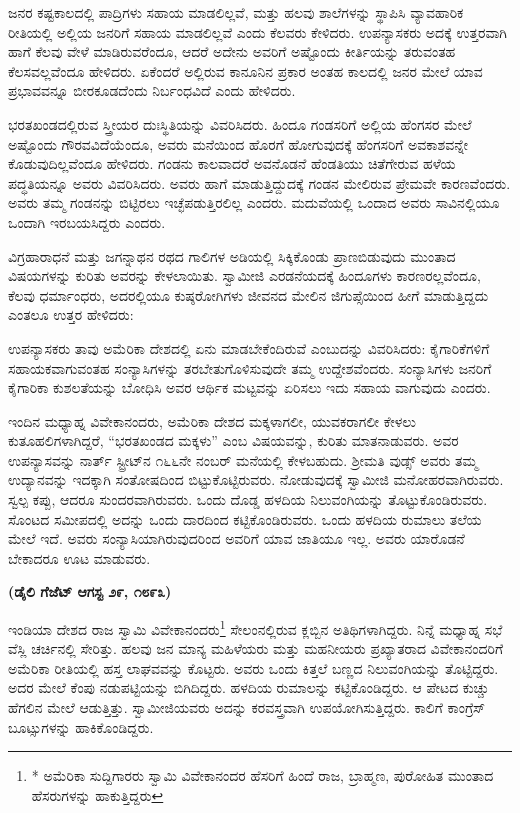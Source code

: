 ಜನರ ಕಷ್ಟಕಾಲದಲ್ಲಿ ಪಾದ್ರಿಗಳು ಸಹಾಯ ಮಾಡಲಿಲ್ಲವೆ, ಮತ್ತು ಹಲವು ಶಾಲೆಗಳನ್ನು ಸ್ಥಾಪಿಸಿ ವ್ಯಾವಹಾರಿಕ ರೀತಿಯಲ್ಲಿ ಅಲ್ಲಿಯ ಜನರಿಗೆ ಸಹಾಯ ಮಾಡಲಿಲ್ಲವೆ ಎಂದು ಕೆಲವರು ಕೇಳಿದರು. ಉಪನ್ಯಾಸಕರು ಅದಕ್ಕೆ ಉತ್ತರವಾಗಿ ಹಾಗೆ ಕೆಲವು ವೇಳೆ ಮಾಡಿರುವ\break ರೆಂದೂ, ಆದರೆ ಅದೇನು ಅವರಿಗೆ ಅಷ್ಟೊಂದು ಕೀರ್ತಿಯನ್ನು ತರುವಂತಹ ಕೆಲಸವಲ್ಲ\break ವೆಂದೂ ಹೇಳಿದರು. ಏಕೆಂದರೆ ಅಲ್ಲಿರುವ ಕಾನೂನಿನ ಪ್ರಕಾರ ಅಂತಹ ಕಾಲದಲ್ಲಿ ಜನರ ಮೇಲೆ ಯಾವ ಪ್ರಭಾವವನ್ನೂ ಬೀರಕೂಡದೆಂದು ನಿರ್ಬಂಧವಿದೆ ಎಂದು ಹೇಳಿದರು.

ಭರತಖಂಡದಲ್ಲಿರುವ ಸ್ತ್ರೀಯರ ದುಃಸ್ಥಿತಿಯನ್ನು ವಿವರಿಸಿದರು. ಹಿಂದೂ ಗಂಡಸರಿಗೆ ಅಲ್ಲಿಯ ಹೆಂಗಸರ ಮೇಲೆ ಅಷ್ಟೊಂದು ಗೌರವವಿದೆಯೆಂದೂ, ಅವರು ಮನೆಯಿಂದ ಹೊರಗೆ ಹೋಗುವುದಕ್ಕೆ ಹೆಂಗಸರಿಗೆ ಅವಕಾಶವನ್ನೇ ಕೊಡುವುದಿಲ್ಲವೆಂದೂ ಹೇಳಿದರು. ಗಂಡನು ಕಾಲವಾದರೆ ಅವನೊಡನೆ ಹೆಂಡತಿಯು ಚಿತೆಗೇರುವ ಹಳೆಯ ಪದ್ಧತಿಯನ್ನೂ ಅವರು ವಿವರಿಸಿದರು. ಅವರು ಹಾಗೆ ಮಾಡುತ್ತಿದ್ದುದಕ್ಕೆ ಗಂಡನ ಮೇಲಿರುವ ಪ್ರೇಮವೇ ಕಾರಣವೆಂದರು. ಅವರು ತಮ್ಮ ಗಂಡನನ್ನು ಬಿಟ್ಟಿರಲು ಇಚ್ಛೆಪಡುತ್ತಿರಲಿಲ್ಲ ಎಂದರು. ಮದುವೆಯಲ್ಲಿ ಒಂದಾದ ಅವರು ಸಾವಿನಲ್ಲಿಯೂ ಒಂದಾಗಿ ಇರಬಯಸಿದ್ದರು ಎಂದರು.

ವಿಗ್ರಹಾರಾಧನೆ ಮತ್ತು ಜಗನ್ನಾಥನ ರಥದ ಗಾಲಿಗಳ ಅಡಿಯಲ್ಲಿ ಸಿಕ್ಕಿಕೊಂಡು ಪ್ರಾಣಬಿಡುವುದು ಮುಂತಾದ ವಿಷಯಗಳನ್ನು ಕುರಿತು ಅವರನ್ನು ಕೇಳಲಾಯಿತು. ಸ್ವಾಮೀಜಿ ಎರಡನೆಯದಕ್ಕೆ ಹಿಂದೂಗಳು ಕಾರಣರಲ್ಲವೆಂದೂ, ಕೆಲವು ಧರ್ಮಾಂಧರು, ಅದರಲ್ಲಿಯೂ ಕುಷ್ಠರೋಗಿಗಳು ಜೀವನದ ಮೇಲಿನ ಜಿಗುಪ್ಸೆಯಿಂದ ಹೀಗೆ ಮಾಡು\break ತ್ತಿದ್ದದು ಎಂತಲೂ ಉತ್ತರ ಹೇಳಿದರು:

ಉಪನ್ಯಾಸಕರು ತಾವು ಅಮೆರಿಕಾ ದೇಶದಲ್ಲಿ ಏನು ಮಾಡಬೇಕೆಂದಿರುವೆ ಎಂಬುದನ್ನು ವಿವರಿಸಿದರು: ಕೈಗಾರಿಕೆಗಳಿಗೆ ಸಹಾಯಕವಾಗುವಂತಹ ಸಂನ್ಯಾಸಿಗಳನ್ನು ತರಬೇತುಗೊಳಿಸು\break ವುದೇ ತಮ್ಮ ಉದ್ದೇಶವೆಂದರು. ಸಂನ್ಯಾಸಿಗಳು ಜನರಿಗೆ ಕೈಗಾರಿಕಾ ಕುಶಲತೆಯನ್ನು ಬೋಧಿಸಿ ಅವರ ಆರ್ಥಿಕ ಮಟ್ಟವನ್ನು ಏರಿಸಲು ಇದು ಸಹಾಯ ವಾಗುವುದು ಎಂದರು.

ಇಂದಿನ ಮಧ್ಯಾಹ್ನ ವಿವೇಕಾನಂದರು, ಅಮೆರಿಕಾ ದೇಶದ ಮಕ್ಕಳಾಗಲೀ, ಯುವಕ\break ರಾಗಲೀ ಕೇಳಲು ಕುತೂಹಲಿಗಳಾಗಿದ್ದರೆ, “ಭರತಖಂಡದ ಮಕ್ಕಳು” ಎಂಬ ವಿಷಯವನ್ನು, ಕುರಿತು ಮಾತನಾಡುವರು. ಅವರ ಉಪನ್ಯಾಸವನ್ನು ನಾರ್ತ್​ ಸ್ಟ್ರೀಟ್​ನ ೧೬೬ನೇ ನಂಬರ್​ ಮನೆಯಲ್ಲಿ ಕೇಳಬಹುದು. ಶ‍್ರೀಮತಿ ವುಡ್ಸ್​ ಅವರು ತಮ್ಮ ಉದ್ಯಾನವನ್ನು ಇದಕ್ಕಾಗಿ ಸಂತೋಷದಿಂದ ಬಿಟ್ಟುಕೊಟ್ಟಿರುವರು. ನೋಡುವುದಕ್ಕೆ ಸ್ವಾಮೀಜಿ ಮನೋಹರವಾಗಿರು\break ವರು. ಸ್ವಲ್ಪ ಕಪ್ಪು, ಆದರೂ ಸುಂದರವಾಗಿರುವರು. ಒಂದು ದೊಡ್ಡ ಹಳದಿಯ ನಿಲುವಂಗಿ\break ಯನ್ನು ತೊಟ್ಟುಕೊಂಡಿರುವರು. ಸೊಂಟದ ಸಮೀಪದಲ್ಲಿ ಅದನ್ನು ಒಂದು ದಾರದಿಂದ ಕಟ್ಟಿಕೊಂಡಿರುವರು. ಒಂದು ಹಳದಿಯ ರುಮಾಲು ತಲೆಯ ಮೇಲೆ ಇದೆ. ಅವರು ಸಂನ್ಯಾಸಿಯಾಗಿರುವುದರಿಂದ ಅವರಿಗೆ ಯಾವ ಜಾತಿಯೂ ಇಲ್ಲ. ಅವರು ಯಾರೊಡನೆ ಬೇಕಾದರೂ ಊಟ ಮಾಡುವರು.

\begin{center}
\textbf{(ಡೈಲಿ ಗೆಜೆಟ್​ ಆಗಸ್ಟ ೨೯, ೧೮೯೩)}
\end{center}

\vskip -0.35cm

ಇಂಡಿಯಾ ದೇಶದ ರಾಜ ಸ್ವಾಮಿ ವಿವೇಕಾನಂದರು\footnote{* ಅಮೆರಿಕಾ ಸುದ್ದಿಗಾರರು ಸ್ವಾಮಿ ವಿವೇಕಾನಂದರ ಹೆಸರಿಗೆ ಹಿಂದೆ ರಾಜ, ಬ್ರಾಹ್ಮಣ, ಪುರೋಹಿತ ಮುಂತಾದ ಹೆಸರುಗಳನ್ನು ಹಾಕುತ್ತಿದ್ದರು} ಸೇಲಂನಲ್ಲಿರುವ  ಕ್ಲಬ್ಬಿನ ಅತಿಥಿಗಳಾಗಿದ್ದರು. ನಿನ್ನೆ ಮಧ್ಯಾಹ್ನ ಸಭೆ ವೆಸ್ಲಿ ಚರ್ಚಿನಲ್ಲಿ ಸೇರಿತ್ತು. ಹಲವು ಜನ ಮಾನ್ಯ ಮಹಿಳೆಯರು ಮತ್ತು ಮಹನೀಯರು ಪ್ರಖ್ಯಾತರಾದ ವಿವೇಕಾನಂದರಿಗೆ ಅಮೆರಿಕಾ ರೀತಿಯಲ್ಲಿ ಹಸ್ತ ಲಾಘವವನ್ನು ಕೊಟ್ಟರು. ಅವರು ಒಂದು ಕಿತ್ತಲೆ ಬಣ್ಣದ ನಿಲುವಂಗಿಯನ್ನು ತೊಟ್ಟಿದ್ದರು. ಅದರ ಮೇಲೆ ಕೆಂಪು ನಡುಪಟ್ಟಿಯನ್ನು ಬಿಗಿದಿದ್ದರು. ಹಳದಿಯ ರುಮಾಲನ್ನು ಕಟ್ಟಿಕೊಂಡಿದ್ದರು. ಆ ಪೇಟದ ಕುಚ್ಚು ಹೆಗಲಿನ ಮೇಲೆ ಆಡುತ್ತಿತ್ತು. ಸ್ವಾಮೀಜಿಯವರು ಅದನ್ನು ಕರವಸ್ತ್ರವಾಗಿ ಉಪಯೋಗಿಸುತ್ತಿದ್ದರು. ಕಾಲಿಗೆ ಕಾಂಗ್ರೆಸ್​ ಬೂಟ್ಸುಗಳನ್ನು ಹಾಕಿಕೊಂಡಿದ್ದರು.

